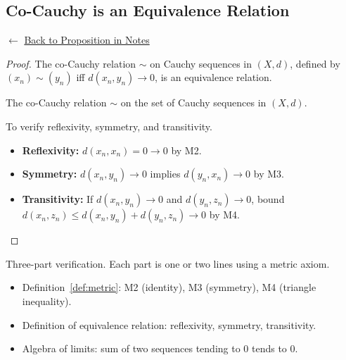 
\subsection*{Co-Cauchy is an Equivalence Relation}
\label{prf:co-cauchy-equivalence-relation}

\begin{remark*}[Return]
$\leftarrow$ \hyperref[prop:co-cauchy-equivalence-relation]{Back to Proposition in Notes}
\end{remark*}

\begin{proof}
\Claim The co-Cauchy relation $\sim$ on Cauchy sequences in $(X,d)$,
defined by $(x_n) \sim (y_n)$ iff $d(x_n, y_n) \to 0$,
is an equivalence relation.

\Given The co-Cauchy relation $\sim$ on the set of Cauchy sequences in $(X,d)$.

\Goal To verify reflexivity, symmetry, and transitivity.

\Strategy
\begin{itemize}
  \item \textbf{Reflexivity:} $d(x_n, x_n) = 0 \to 0$ by M2.
  \item \textbf{Symmetry:} $d(x_n, y_n) \to 0$ implies $d(y_n, x_n) \to 0$ by M3.
  \item \textbf{Transitivity:} If $d(x_n, y_n) \to 0$ and $d(y_n, z_n) \to 0$,
        bound $d(x_n, z_n) \le d(x_n, y_n) + d(y_n, z_n) \to 0$ by M4.
\end{itemize}


\end{proof}

\begin{remark*}
Three-part verification. Each part is one or two lines using a metric axiom.
\end{remark*}

\begin{remark*}[Dependencies]
\begin{itemize}
  \item Definition~\ref{def:metric}: M2 (identity), M3 (symmetry), M4 (triangle inequality).
  \item Definition of equivalence relation: reflexivity, symmetry, transitivity.
  \item Algebra of limits: sum of two sequences tending to $0$ tends to $0$.
\end{itemize}
\end{remark*}
